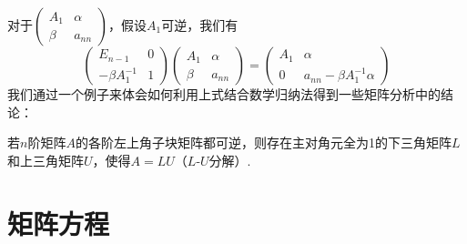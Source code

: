 对于$\begin{pmatrix}
        A_1 & \alpha \\ \beta & a_{nn}
    \end{pmatrix}$，假设$A_1$可逆，我们有
\[\begin{pmatrix}
        E_{n-1} & 0 \\ -\beta A_1^{-1} & 1
    \end{pmatrix}\begin{pmatrix}
        A_1 & \alpha \\ \beta & a_{nn}
    \end{pmatrix}=\begin{pmatrix}
        A_1 & \alpha \\ 0 & a_{nn}-\beta A_1^{-1}\alpha
    \end{pmatrix}\]
我们通过一个例子来体会如何利用上式结合数学归纳法得到一些矩阵分析中的结论：
\begin{example}
    若$n$阶矩阵$A$的各阶左上角子块矩阵都可逆，则存在主对角元全为1的下三角矩阵$L$和上三角矩阵$U$，使得$A=LU$（$L$-$U$分解）.
\end{example}

\begin{solution}

\end{solution}

\section{矩阵方程}

